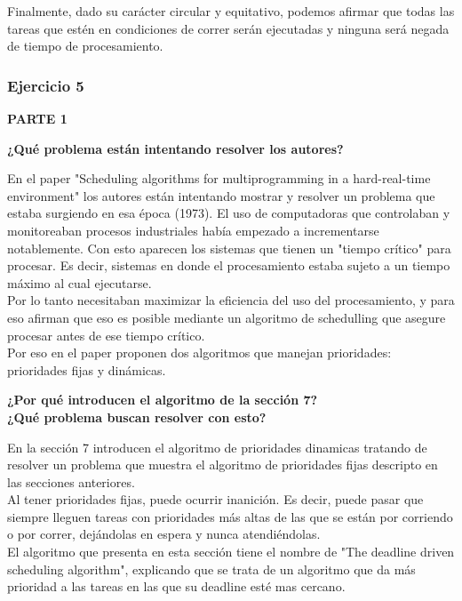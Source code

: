 \indent Finalmente, dado su carácter circular y equitativo, podemos afirmar que todas las tareas que 
estén en condiciones de correr serán ejecutadas y ninguna será negada de tiempo de procesamiento.\\


\subsubsection[Resolución Ejercicio 5]{Ejercicio 5}
\begin{center}
\textbf{PARTE 1}\\ 
\end{center}

\begin{center}
 \textbf{¿Qué problema están intentando resolver los autores?}
\end{center}

En el paper "Scheduling algorithms for multiprogramming
in a hard-real-time environment" los autores están intentando mostrar y resolver un problema que estaba surgiendo en esa época (1973). El uso de computadoras que controlaban y monitoreaban procesos industriales había empezado a incrementarse notablemente. Con esto aparecen los sistemas que tienen un "tiempo crítico" para procesar. Es decir, sistemas en donde el procesamiento estaba sujeto a un tiempo máximo al cual ejecutarse.\\
Por lo tanto necesitaban maximizar la eficiencia del uso del procesamiento, y para eso afirman que eso es posible mediante un algoritmo de schedulling que asegure procesar antes de ese tiempo crítico.\\
Por eso en el paper proponen dos algoritmos que manejan prioridades: prioridades fijas y dinámicas.\\

\begin{center}
 \textbf{¿Por qué introducen el algoritmo de la sección 7?\\¿Qué problema buscan resolver
 con esto?}
\end{center}

En la sección 7 introducen el algoritmo de prioridades dinamicas tratando de resolver un problema que muestra el algoritmo de prioridades fijas descripto en las secciones anteriores.\\
Al tener prioridades fijas, puede ocurrir inanición. Es decir, puede pasar que siempre lleguen tareas con prioridades más altas de las que se están por corriendo o por correr, dejándolas en espera y nunca atendiéndolas.\\
El algoritmo que presenta en esta sección tiene el nombre de "The deadline driven scheduling algorithm", explicando que se trata de un algoritmo que da más prioridad a las tareas en las que su deadline esté mas cercano. \\

